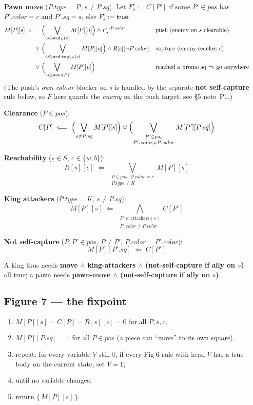 \documentclass[11pt]{article}
\theoremstyle{plain}
\theoremstyle{definition}
\newcommand{\pos}{\mathit{pos}}
\newcommand{\sq}{\mathit{sq}}
\newcommand{\predP}{\mathrm{pred}_P}
\newcommand{\predcaptP}{\mathrm{pred\text{-}capt}_P}
\newcommand{\prom}{\mathrm{prom}}
\newcommand{\attackers}{\mathrm{attackers}}
\newcommand{\true}{\ensuremath{\mathsf{true}}}
\newcommand{\becomes}{\;\Longleftarrow\;}
\begin{document}
\textbf{Pawn move} ($P.\mathit{type} = P$, $s \ne P.\sq$). Let $F_s^c := C[P']$ if some $P' \in \pos$ has
$P'.\mathit{color} = c$ and $P'.\sq = s$, else $F_s^c := \true$:
\[
  \begin{aligned}
    M[P][s] \becomes\ & \Bigl( \bigvee_{u \in \predP(s)} M[P][u] \Bigr) \land F_s^{\neg P.\mathit{color}} && \text{push (enemy on $s$ clearable)} \\
    \lor\ & \Bigl( \bigvee_{u \in \predcaptP(s)} M[P][u] \Bigr) \land R[s][\neg P.\mathit{color}] && \text{capture (enemy reaches $s$)} \\
    \lor\ & \Bigl( \bigvee_{u \in \prom(P)} M[P][u] \Bigr) && \text{reached a promo sq $\Rightarrow$ go anywhere}
  \end{aligned}
\]
(The push's \emph{own-colour} blocker on $s$ is handled by the separate \textbf{not self-capture} rule below, so $F$
here guards the \emph{enemy} on the push target; see \S5 note~P1.)

\textbf{Clearance} ($P \in \pos$):
\[
  C[P] \becomes \Bigl( \bigvee_{s \ne P.\sq} M[P][s] \Bigr) \lor \Bigl( \bigvee_{\substack{P' \in \pos \\ P'.\mathit{color} \ne P.\mathit{color}}} M[P'][P.\sq] \Bigr)
\]

\textbf{Reachability} ($s \in S$, $c \in \{w,b\}$):
\[
  R[s][c] \becomes \bigvee_{\substack{P \in \pos,\ P.\mathit{color} = c \\ P.\mathit{type} \ne K}} M[P][s]
\]

\textbf{King attackers} ($P.\mathit{type} = K$, $s \ne P.\sq$):
\[
  M[P][s] \becomes \bigwedge_{\substack{P' \in \attackers(s) \\ P'.\mathit{color} \ne P.\mathit{color}}} C[P']
\]

\textbf{Not self-capture} ($P, P' \in \pos$, $P \ne P'$, $P.\mathit{color} = P'.\mathit{color}$):
\[
  M[P][P'.\sq] \becomes C[P']
\]

A king thus needs \textbf{move $\land$ king-attackers $\land$ (not-self-capture if ally on $s$)} all true; a pawn needs
\textbf{pawn-move $\land$ (not-self-capture if ally on $s$)}.

\subsection{Figure 7 --- the fixpoint}

\begin{enumerate}[leftmargin=2.4em,label=\arabic*.]
  \item $M[P][s] = C[P] = R[s][c] = 0$ for all $P, s, c$.
  \item $M[P][P.\sq] = 1$ for all $P \in \pos$ \quad (a piece can ``move'' to its own square).
  \item repeat: for every variable $V$ still 0, if every Fig-6 rule with head $V$ has a true body on the current state, set $V = 1$;
  \item until no variable changes;
  \item return $\{\, M[P][s] \,\}$.
\end{enumerate}
\end{document}
